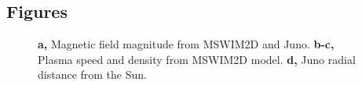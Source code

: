 \documentclass[
  letterpaper,
  DIV=11,
  numbers=noendperiod]{scrartcl}
\begin{document}
\subsection{Figures}\label{figures}

\begin{figure}


\caption{\label{fig-model}\textbf{a,} Magnetic field magnitude from MSWIM2D and Juno. \textbf{b-c,} Plasma speed and density from MSWIM2D model. \textbf{d,} Juno radial distance from the Sun.}

\end{figure}%
\end{document}
